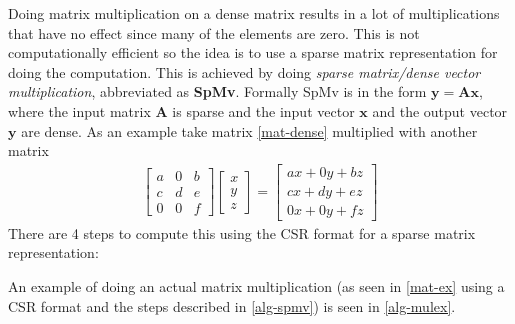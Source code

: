 Doing matrix multiplication on a dense matrix results in a lot of multiplications that have no effect since many of the elements are zero.
This is not computationally efficient so the idea is to use a sparse matrix representation for doing the computation.
This is achieved by doing \textit{sparse matrix/dense vector multiplication}, abbreviated as \textbf{SpMv}.
Formally SpMv is in the form $\mathbf{y=Ax}$, where the input matrix $\mathbf{A}$ is sparse and the input vector $\mathbf{x}$ and the output vector $\mathbf{y}$ are dense.
As an example take matrix \ref{mat-dense} multiplied with another matrix
\begin{gather}
	\begin{bmatrix}
		a & 0 & b \\[0.3em]
		c & d & e \\[0.3em]
		0 & 0 & f
	\end{bmatrix}
	\begin{bmatrix}
		x \\[0.3em]
		y \\[0.3em]
		z 
	\end{bmatrix}
	=
	\begin{bmatrix}
	ax + 0y + bz \\[0.3em]
	cx + dy + ez \\[0.3em]
	0x + 0y + fz
	\end{bmatrix}
	\label{mat-ex}
\end{gather}
There are 4 steps to compute this using the CSR format for a sparse matrix representation:
\begin{center}
	\label{alg-spmv}
\end{center}
An example of doing an actual matrix multiplication (as seen in \autoref{mat-ex} using a CSR format and the steps described in \autoref{alg-spmv}) is seen in \autoref{alg-mulex}.
